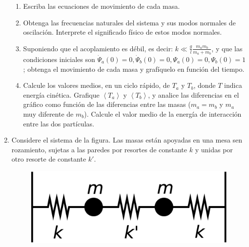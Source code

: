 \documentclass[11pt,spanish,a4paper]{article}
\begin{document}
\begin{enumerate}
\begin{enumerate}
\item Escriba las ecuaciones de movimiento de cada masa. 
\item Obtenga las frecuencias naturales del sistema y sus modos normales
de oscilación. Interprete el significado físico de estos modos normales. 
\item Suponiendo que el acoplamiento es débil, es decir: $k\ll\frac{g}{l}\frac{m_{a}m_{b}}{m_{a}+m_{b}}$,
y que las condiciones iniciales son $\dot{\Psi}_{a}(0)=0,\dot{\Psi}_{b}(0)=0,\Psi_{a}(0)=0,\Psi_{b}(0)=1$;
obtenga el movimiento de cada masa y grafíquelo en función del tiempo. 
\item Calcule los valores medios, en un ciclo rápido, de $T_{a}$ y $T_{b}$,
donde $T$ indica energía cinética. Grafique $\left\langle T_{a}\right\rangle $
y $\left\langle T_{b}\right\rangle $, y analice las diferencias en
el gráfico como función de las diferencias entre las masas ($m_{a}=m_{b}$
y $m_{a}$ muy diferente de $m_{b}$). Calcule el valor medio de la
energía de interacción entre las dos partículas.
\end{enumerate}
\item Considere el sistema de la figura. Las masas están apoyadas en una
mesa sen rozamiento, sujetas a las paredes por resortes de constante
$k$ y unidas por otro resorte de constante $k'$. 
\begin{figure}[H]
\centering{}\includegraphics[clip,scale=0.25]{ej1-8}
\end{figure}



\end{enumerate}
\end{document}
